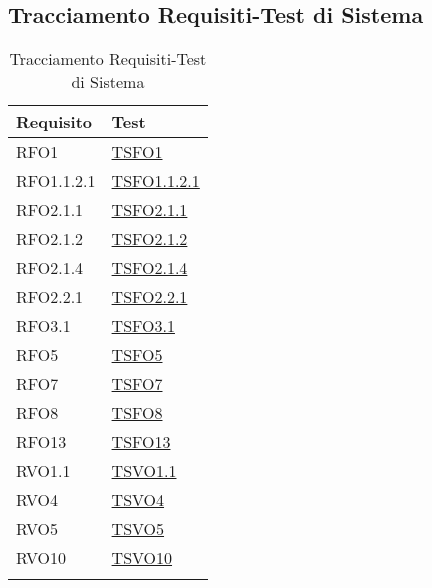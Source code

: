 \subsection{Tracciamento Requisiti-Test di Sistema}
\normalsize
\begin{longtable}{|>{\centering}m{5cm}|m{5cm}<{\centering}|}
\hline 
\textbf{Requisito} & \textbf{Test}\\
\hline
\endhead
RFO1 & \hyperlink{TSFO1}{TSFO1}\\ \hline
RFO1.1.2.1 & \hyperlink{TSFO1.1.2.1}{TSFO1.1.2.1}\\ \hline
RFO2.1.1 & \hyperlink{TSFO2.1.1}{TSFO2.1.1}\\ \hline
RFO2.1.2 & \hyperlink{TSFO2.1.2}{TSFO2.1.2}\\ \hline
RFO2.1.4 & \hyperlink{TSFO2.1.4}{TSFO2.1.4}\\ \hline
RFO2.2.1 & \hyperlink{TSFO2.2.1}{TSFO2.2.1}\\ \hline
RFO3.1 & \hyperlink{TSFO3.1}{TSFO3.1}\\ \hline
RFO5 & \hyperlink{TSFO5}{TSFO5}\\ \hline
RFO7 & \hyperlink{TSFO7}{TSFO7}\\ \hline
RFO8 & \hyperlink{TSFO8}{TSFO8}\\ \hline
RFO13 & \hyperlink{TSFO13}{TSFO13}\\ \hline
RVO1.1 & \hyperlink{TSVO1.1}{TSVO1.1}\\ \hline
RVO4 & \hyperlink{TSVO4}{TSVO4}\\ \hline
RVO5 & \hyperlink{TSVO5}{TSVO5}\\ \hline
RVO10 & \hyperlink{TSVO10}{TSVO10}\\ \hline
\caption[Tracciamento Requisiti-Test di Sistema]{Tracciamento Requisiti-Test di Sistema}
\label{tabella:requi-tv}
\end{longtable}
\clearpage
